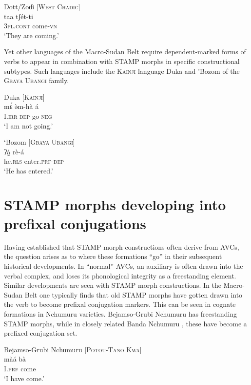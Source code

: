 \documentclass[output=paper]{langsci/langscibook}
\begin{document}
\ea\label{ex:anderson:36}
Dott/Zoɗi \citep[165]{Caron2002}            [W\textsc{est} \textsc{Chadic}]\\
\gll taa    tʃét-ti\\
\textsc{3pl.cont}  come-\textsc{vn}\\
\glt `They are coming.'
\z

Yet other languages of the Macro-Sudan Belt require dependent-marked forms of verbs to appear in combination with STAMP morphs in specific constructional subtypes. Such languages include the \textsc{Kainji} language Duka  and 'Bozom  of the \textsc{Gbaya Ubangi} family. 

\ea\label{ex:anderson:37}
Duka  \citep[96-98; 105]{BendorSamuelEtAl1973}     \textsc{[Kainji]}\\
\gll m\'{ɛ}     \`{ə}m-hà     á\\
I.\textsc{irr}  \textsc{dep}-go   \textsc{neg}  \\
\glt `I am not going.' 
\z

\ea\label{ex:anderson:38}
`Bozom \citep[159]{Monino1995}            \textsc{[Gbaya Ubangi]}\\
\gll ʔà̰    rè-á      \\
he.\textsc{rls}  enter.\textsc{prf}-\textsc{dep} \\
\glt `He has entered.'
\z

\section{STAMP morphs developing into prefixal conjugations}\label{sec:Anderson:6}


Having established that STAMP morph constructions often derive from AVCs, the question arises as to where these formations ``go'' in their subsequent historical developments. In ``normal'' AVCs, an auxiliary is often drawn into the verbal complex, and loses its phonological integrity as a freestanding element. Similar developments are seen with STAMP morph constructions. In the Macro-Sudan Belt one typically finds that old STAMP morphs have gotten drawn into the verb to become prefixal conjugation markers. This can be seen in cognate formations in Nchumuru varieties. Bejamso-Grubi Nchumuru  has freestanding STAMP morphs, while in closely related Banda Nchumuru , these have become a prefixed conjugation set.

\ea\label{ex:anderson:39}
Bejamso-Grubi Nchumuru  \citep[Nchumuru 5]{Price1975}   [\textsc{Potou-Tano} K\textsc{wa}]\\
\gll màá  bà\\
I.\textsc{prf}  come\\
\glt `I have come.'
\z
\end{document}
